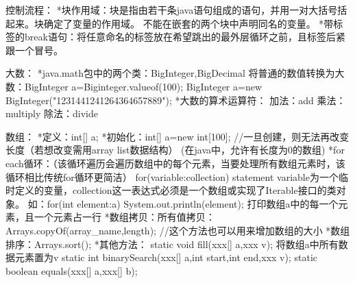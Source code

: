 控制流程：
*块作用域：块是指由若干条java语句组成的语句，并用一对大括号括起来。块确定了变量的作用域。
          不能在嵌套的两个块中声明同名的变量。
*带标签的break语句：将任意命名的标签放在希望跳出的最外层循环之前，且标签后紧跟一个冒号。

大数：
*java.math包中的两个类：BigInteger,BigDecimal
      将普通的数值转换为大数：BigInteger a=Biginteger.valueof(100);
      BigInteger a=new BigInteger("1231441241264364657889");
*大数的算术运算符：
      加法：add
      乘法：multiply
      除法：divide

数组：
*定义：int[] a; 
*初始化：int[] a=new int[100]; //一旦创建，则无法再改变长度（若想改变需用array list数据结构）
(在java中，允许有长度为0的数组)
*for each循环：（该循环遍历会遍历数组中的每个元素，当要处理所有数组元素时，该循环相比传统for循环更简洁）
     for(variable:collection) statement   variable为一个临时定义的变量，collection这一表达式必须是一个数组或实现了Iterable接口的类对象。
     如：for(int element:a)
         {
             System.out.println(element);
          }
     打印数组a中的每一个元素，且一个元素占一行
*数组拷贝：所有值拷贝：Arrays.copyOf(array_name,length); //这个方法也可以用来增加数组的大小
*数组排序：Arrays.sort();
*其他方法：
     static void fill(xxx[] a,xxx v); 将数组a中所有数据元素置为v
     static int binarySearch(xxx[] a,int start,int end,xxx v);
     static boolean equals(xxx[] a,xxx[] b);














     

